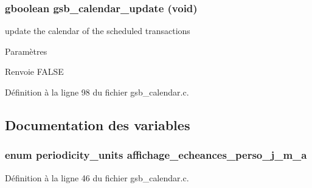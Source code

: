 \subsubsection[{gsb\_\-calendar\_\-update}]{\setlength{\rightskip}{0pt plus 5cm}gboolean gsb\_\-calendar\_\-update (void)}\label{gsb__calendar_8h_a97c1d6d132f4597521b5ec7bd8440cfb}
update the calendar of the scheduled transactions


\begin{DoxyParams}{Paramètres}
\item[{\em }]\end{DoxyParams}
\begin{DoxyReturn}{Renvoie}
FALSE 
\end{DoxyReturn}


Définition à la ligne 98 du fichier gsb\_\-calendar.c.



\subsection{Documentation des variables}
\subsubsection[{affichage\_\-echeances\_\-perso\_\-j\_\-m\_\-a}]{\setlength{\rightskip}{0pt plus 5cm}enum {\bf periodicity\_\-units} {\bf affichage\_\-echeances\_\-perso\_\-j\_\-m\_\-a}}\label{gsb__calendar_8h_ab8c2018709e0110f2519d8233bb489d3}


Définition à la ligne 46 du fichier gsb\_\-calendar.c.

